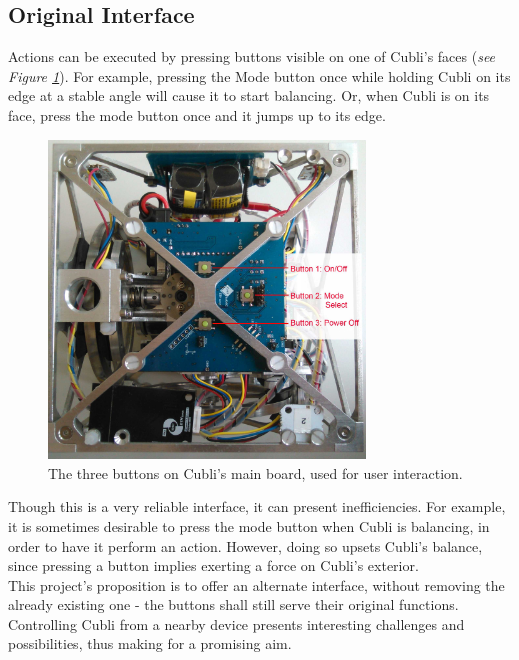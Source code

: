 \subsection{Original Interface}
 
Actions can be executed by pressing buttons visible on one of Cubli's faces (\textit{see Figure \ref{img:Buttons}}). For example, pressing the Mode button once while holding Cubli on its edge at a stable angle will cause it to start balancing. Or, when Cubli is on its face, press the mode button once and it jumps up to its edge.\\

\begin{figure}[ht]
   \centering
   \includegraphics[width=0.75\textwidth]{img/Buttons.jpg}
   \caption{The three buttons on Cubli's main board, used for user interaction.}
   \label{img:Buttons}
\end{figure}

Though this is a very reliable interface, it can present inefficiencies. For example, it is sometimes desirable to press the mode button when Cubli is balancing, in order to have it perform an action. However, doing so upsets Cubli's balance, since pressing a button implies exerting a force on Cubli's exterior.\\

This project's proposition is to offer an alternate interface, without removing the already existing one - the buttons shall still serve their original functions. Controlling Cubli from a nearby device presents interesting challenges and possibilities, thus making for a promising aim.

